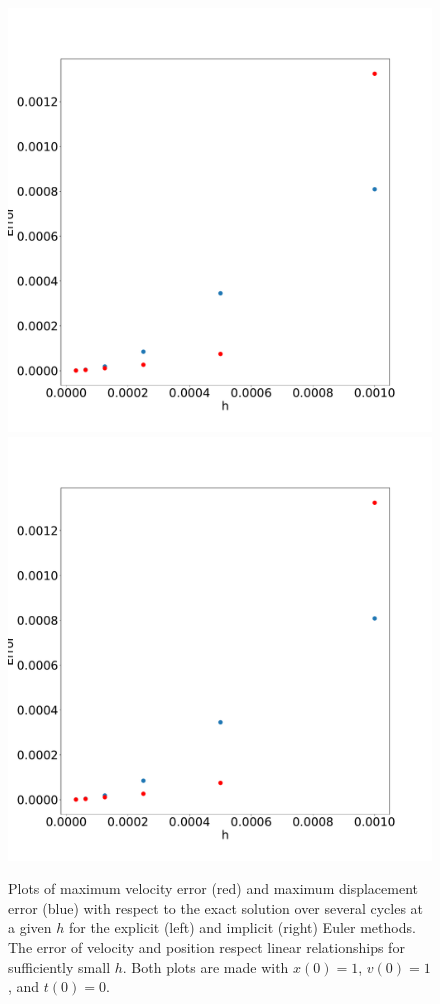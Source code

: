 \documentclass[11pt, oneside]{article}   	%
\begin{document}
\begin{section}
\begin{figure}[H]
\includegraphics[width=.5\textwidth, height=.35\textheight]{errorvsH.pdf}
\includegraphics[width=.5\textwidth, height=.35\textheight]{errorvsH2.pdf}
\caption{Plots of maximum velocity error (red) and maximum displacement error (blue) with respect to the exact solution over several cycles at a given $h$ for the explicit (left) and implicit (right) Euler methods. The error of velocity and position respect linear relationships for sufficiently small $h$. Both plots are made with $x(0) = 1$, $v(0) = 1$, and $t(0) = 0$.}
\end{figure}


\end{section}
\end{document}
